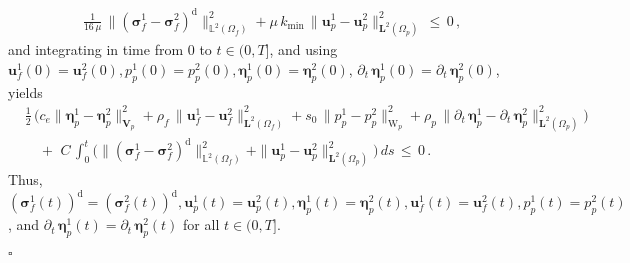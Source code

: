 \documentclass[11pt]{article}
\numberwithin{equation}{section}
\newcommand{\bbeta}{{\boldsymbol\eta}}
\newcommand{\bsi}{{\boldsymbol\sigma}}
\newcommand{\bu}{\mathbf{u}}
\newcommand{\0}{{\mathbf{0}}}
\def\bV{\mathbf{V}}
\newcommand{\bL}{\mathbf{L}}
\newcommand\bbL{\mathbb{L}}
\def\W{\mathrm{W}}
\def\rd{\mathrm{d}}
\newenvironment{proof}{\noindent{\it Proof.}}{\hfill$\square$}
\numberwithin{equation}{section}
\begin{document}
\begin{proof}
\begin{align}
&\quad \frac{1}{16\,\mu}\,\|(\bsi^1_f - \bsi^2_f)^\rd\|^2_{\bbL^2(\Omega_f)} + \mu\,k_{\min}\,\|\bu^1_p - \bu^2_p\|^2_{\bL^2(\Omega_p)}\,\leq\, 0 \,,\label{eq:thm4.11-coercivitybounds}
\end{align}
and integrating in time from $0$ to $t\in (0,T]$,  and using $\bu^1_f(0) = \bu^2_f(0), p^1_p(0) = p^2_p(0), \bbeta^1_p(0) = \bbeta^2_p(0)$,
$\partial_t\,\bbeta^1_p(0) = \partial_t\,\bbeta^2_p(0)$, yields
\begin{align*}
&\frac{1}{2}\,\Big( c_e\|\bbeta^1_p - \bbeta^2_p\|^2_{\bV_p}  + \rho_f\,\|\bu^1_f - \bu^2_f\|^2_{\bL^2(\Omega_f)} + s_0\,\|p^1_p - p^2_p\|^2_{\W_p} +\rho_p\,\|\partial_t\,\bbeta^1_p - \partial_t\,\bbeta^2_p\|^2_{\bL^2(\Omega_p)}\Big)  \nonumber\\ 
& \quad +\,\, C\,\int^t_0 \Big(\|(\bsi^1_f - \bsi^2_f)^\rd\|^2_{\bbL^2(\Omega_f)} + \|\bu^1_p - \bu^2_p\|^2_{\bL^2(\Omega_p)} \Big)\, ds \,\leq\, 0 \,.%
\end{align*}
%
Thus, $(\bsi^1_f(t))^\rd = (\bsi^2_f(t))^\rd, \bu^1_p(t) = \bu^2_p(t), \bbeta^1_p(t) = \bbeta^2_p(t), \bu_f^1(t) = \bu_f^2(t), p^1_p(t) = p^2_p(t)$, and $\partial_t\,\bbeta^1_p(t) = \partial_t\,\bbeta^2_p(t)$ for all $t\in (0,T]$.


\end{proof}
\end{document}
